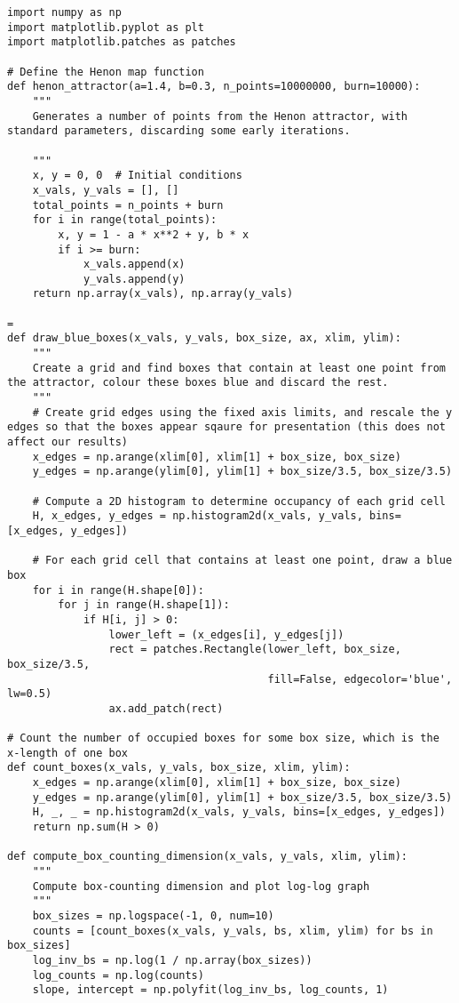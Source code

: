 \begin{lstlisting}[style=python]
import numpy as np
import matplotlib.pyplot as plt
import matplotlib.patches as patches

# Define the Henon map function
def henon_attractor(a=1.4, b=0.3, n_points=10000000, burn=10000):
    """
    Generates a number of points from the Henon attractor, with standard parameters, discarding some early iterations.
    
    """
    x, y = 0, 0  # Initial conditions
    x_vals, y_vals = [], []
    total_points = n_points + burn
    for i in range(total_points):
        x, y = 1 - a * x**2 + y, b * x
        if i >= burn:
            x_vals.append(x)
            y_vals.append(y)
    return np.array(x_vals), np.array(y_vals)

=
def draw_blue_boxes(x_vals, y_vals, box_size, ax, xlim, ylim):
    """
    Create a grid and find boxes that contain at least one point from the attractor, colour these boxes blue and discard the rest.
    """
    # Create grid edges using the fixed axis limits, and rescale the y edges so that the boxes appear sqaure for presentation (this does not affect our results)
    x_edges = np.arange(xlim[0], xlim[1] + box_size, box_size)
    y_edges = np.arange(ylim[0], ylim[1] + box_size/3.5, box_size/3.5)
    
    # Compute a 2D histogram to determine occupancy of each grid cell
    H, x_edges, y_edges = np.histogram2d(x_vals, y_vals, bins=[x_edges, y_edges])
    
    # For each grid cell that contains at least one point, draw a blue box
    for i in range(H.shape[0]):
        for j in range(H.shape[1]):
            if H[i, j] > 0:
                lower_left = (x_edges[i], y_edges[j])
                rect = patches.Rectangle(lower_left, box_size, box_size/3.5,
                                         fill=False, edgecolor='blue', lw=0.5)
                ax.add_patch(rect)

# Count the number of occupied boxes for some box size, which is the x-length of one box
def count_boxes(x_vals, y_vals, box_size, xlim, ylim):
    x_edges = np.arange(xlim[0], xlim[1] + box_size, box_size)
    y_edges = np.arange(ylim[0], ylim[1] + box_size/3.5, box_size/3.5)
    H, _, _ = np.histogram2d(x_vals, y_vals, bins=[x_edges, y_edges])
    return np.sum(H > 0)

def compute_box_counting_dimension(x_vals, y_vals, xlim, ylim):
    """
    Compute box-counting dimension and plot log-log graph
    """
    box_sizes = np.logspace(-1, 0, num=10)
    counts = [count_boxes(x_vals, y_vals, bs, xlim, ylim) for bs in box_sizes]
    log_inv_bs = np.log(1 / np.array(box_sizes))
    log_counts = np.log(counts)
    slope, intercept = np.polyfit(log_inv_bs, log_counts, 1)
    

\end{lstlisting}

